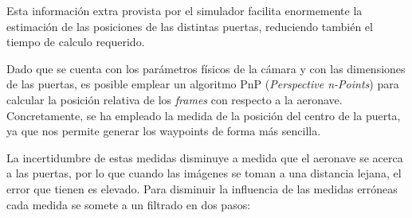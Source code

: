 Esta información extra provista por el simulador facilita enormemente la estimación de las posiciones de las distintas puertas, reduciendo también el tiempo de calculo requerido.



Dado que se cuenta con los parámetros físicos de la cámara y con las dimensiones de las puertas, es posible emplear un algoritmo PnP (\textit{Perspective n-Points}) para calcular la posición relativa de los \textit{frames} con respecto a la aeronave. Concretamente, se ha empleado la medida de la posición del centro de la puerta, ya que nos permite generar los waypoints de forma más sencilla.






La incertidumbre de estas medidas disminuye a medida que el aeronave se acerca a las puertas, por lo que cuando las imágenes se toman a una distancia lejana, el error que tienen es elevado. Para disminuir la influencia de las medidas erróneas cada medida se somete a un filtrado en dos pasos:

